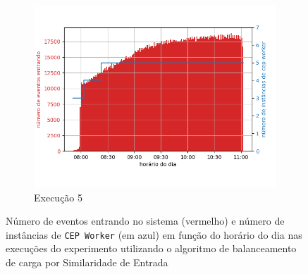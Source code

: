\begin{figure}[p]
\begin{subfigure}{.5\textwidth}
  \includegraphics[width=\linewidth]{figuras/graphics/carga_e_workers_horario10-dez-is.png}  
  \caption{Execução 5}
  \label{fig:cewh-10-dez-is}
\end{subfigure}
\caption{Número de eventos entrando no sistema (vermelho)  e número de instâncias de \texttt{CEP Worker} (em azul) em função do horário do dia nas  execuções do experimento utilizando o algoritmo de balanceamento de carga por Similaridade de Entrada}
\label{fig:load_and_instances-time-IS}
\end{figure}








